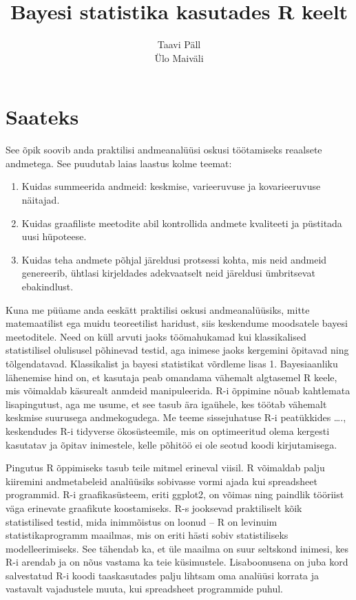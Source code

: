 \documentclass[]{book}
\title{Bayesi statistika kasutades R keelt}
\author{Taavi Päll \\ Ülo Maiväli}
\date{}
\begin{document}
\maketitle

{
\setcounter{tocdepth}{1}
\tableofcontents
}
\chapter*{Saateks}\label{saateks}

See õpik soovib anda praktilisi andmeanalüüsi oskusi töötamiseks
reaalsete andmetega. See puudutab laias laastus kolme teemat:

\begin{enumerate}
\def\labelenumi{\arabic{enumi}.}
\item
  Kuidas summeerida andmeid: keskmise, varieeruvuse ja kovarieeruvuse
  näitajad.
\item
  Kuidas graafiliste meetodite abil kontrollida andmete kvaliteeti ja
  püstitada uusi hüpoteese.
\item
  Kuidas teha andmete põhjal järeldusi protsessi kohta, mis neid andmeid
  genereerib, ühtlasi kirjeldades adekvaatselt neid järeldusi
  ümbritsevat ebakindlust.
\end{enumerate}

Kuna me püüame anda eeskätt praktilisi oskusi andmeanalüüsiks, mitte
matemaatilist ega muidu teoreetilist haridust, siis keskendume
moodsatele bayesi meetoditele. Need on küll arvuti jaoks töömahukamad
kui klassikalised statistilisel olulisusel põhinevad testid, aga inimese
jaoks kergemini õpitavad ning tõlgendatavad. Klassikalist ja bayesi
statistikat võrdleme lisas 1. Bayesiaanliku lähenemise hind on, et
kasutaja peab omandama vähemalt algtasemel R keele, mis võimaldab
käsurealt anmdeid manipuleerida. R-i õppimine nõuab kahtlemata
lisapingutust, aga me usume, et see tasub ära igaühele, kes töötab
vähemalt keskmise suurusega andmekogudega. Me teeme sissejuhatuse R-i
peatükkides \ldots{}., keskendudes R-i tidyverse ökosüsteemile, mis on
optimeeritud olema kergesti kasutatav ja õpitav inimestele, kelle
põhitöö ei ole seotud koodi kirjutamisega.

Pingutus R õppimiseks tasub teile mitmel erineval viisil. R võimaldab
palju kiiremini andmetabeleid analüüsiks sobivasse vormi ajada kui
spreadsheet programmid. R-i graafikasüsteem, eriti ggplot2, on võimas
ning paindlik tööriist väga erinevate graafikute koostamiseks. R-s
jooksevad praktiliselt kõik statistilised testid, mida inimmõistus on
loonud -- R on levinuim statistikaprogramm maailmas, mis on eriti hästi
sobiv statistiliseks modelleerimiseks. See tähendab ka, et üle maailma
on suur seltskond inimesi, kes R-i arendab ja on nõus vastama ka teie
küsimustele. Lisaboonusena on juba kord salvestatud R-i koodi
taaskasutades palju lihtsam oma analüüsi korrata ja vastavalt
vajadustele muuta, kui spreadsheet programmide puhul.
\end{document}
